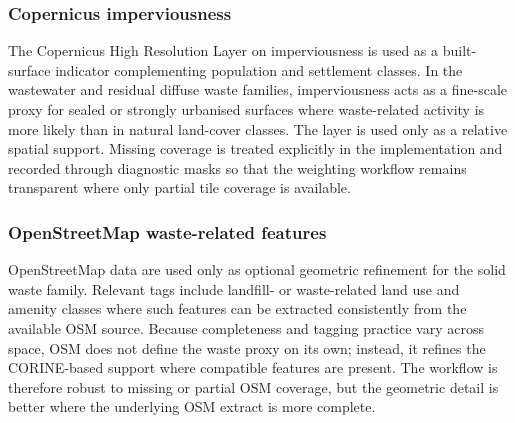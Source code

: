 \subsubsection*{Copernicus imperviousness}
\label{app:waste_imperviousness}

The Copernicus High Resolution Layer on imperviousness is used as a built-surface
indicator complementing population and settlement classes. In the wastewater and
residual diffuse waste families, imperviousness acts as a fine-scale proxy for
sealed or strongly urbanised surfaces where waste-related activity is more
likely than in natural land-cover classes. The layer is used only as a relative
spatial support. Missing coverage is treated explicitly in the implementation
and recorded through diagnostic masks so that the weighting workflow remains
transparent where only partial tile coverage is available.

\subsubsection*{OpenStreetMap waste-related features}
\label{app:waste_osm}

OpenStreetMap data are used only as optional geometric refinement for the solid
waste family. Relevant tags include landfill- or waste-related land use and
amenity classes where such features can be extracted consistently from the
available OSM source. Because completeness and tagging practice vary across
space, OSM does not define the waste proxy on its own; instead, it refines the
CORINE-based support where compatible features are present. The workflow is
therefore robust to missing or partial OSM coverage, but the geometric detail is
better where the underlying OSM extract is more complete.
